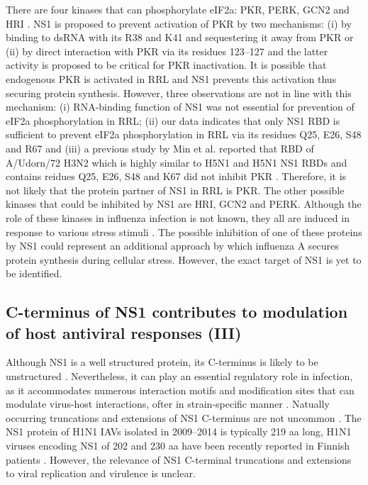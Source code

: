 		There are four kinases that can phosphorylate \gls{eIF2a}: \gls{PKR}, \gls{PERK}, \gls{GCN2} and \gls{HRI} \parencite{Donnelly2013}. NS1 is proposed to prevent activation of \gls{PKR} by two mechanisms: (i) by binding to dsRNA with its R38 and K41 and sequestering it away from \gls{PKR} \parencite{Lu1995} or (ii) by direct interaction with \gls{PKR} via its residues 123--127 \parencite{Min2007} and the latter activity is proposed to be critical for \gls{PKR} inactivation. It is possible that endogenous \gls{PKR} is activated in \gls{RRL} and \gls{NS1} prevents this activation thus securing protein synthesis. However, three observations are not in line with this mechanism: (i) RNA-binding function of NS1 was not essential for prevention of \gls{eIF2a} phosphorylation in \gls{RRL}; (ii) our data indicates that only \gls{NS1} \gls{RBD} is sufficient to prevent \gls{eIF2a} phosphorylation in RRL via its residues Q25, E26, S48 and R67 and (iii) a previous study by Min et al. reported that \gls{RBD} of A/Udorn/72 H3N2 which is highly similar to H5N1 and H5N1 NS1 \glspl{RBD} and contains reidues Q25, E26, S48 and K67 did not inhibit \gls{PKR} \parencite{Min2007}. Therefore, it is not likely that the protein partner of NS1 in \gls{RRL} is \gls{PKR}. The other possible kinases that could be inhibited by \gls{NS1} are \gls{HRI}, \gls{GCN2} and \gls{PERK}. Although the role of these kinases in influenza infection is not known, they all are induced in response to various stress stimuli \parencite{Donnelly2003}. The possible inhibition of one of these proteins by \gls{NS1} could represent an additional approach by which influenza A secures protein synthesis during cellular stress. However, the exact target of NS1 is yet to be identified. 

		
	\subsection{C-terminus of NS1 contributes to modulation of host antiviral responses (III)}
		
		Although NS1 is a well structured protein, its C-terminus is likely to be unstructured \parencite{Hale2008b}. Nevertheless, it can play an essential regulatory role in infection, as it accommodates numerous interaction motifs and modification sites that can modulate virus-host interactions, ofter in strain-specific manner \parencite{Liu2010, Marazzi2012, Li2001, Melen2012, Hsiang2012, Hsiang2009}. Natually occurring truncations and extensions of NS1 C-terminus are not uncommon \parencite{Suarez1998}. The NS1 protein of H1N1 IAVs isolated in 2009--2014 is typically 219 aa long, H1N1 viruses encoding NS1 of 202 and 230 aa have been recently reported in Finnish patients \parencite{Lakspere2014}. However, the relevance of NS1 C-terminal truncations and extensions to viral replication and virulence is unclear.
		
